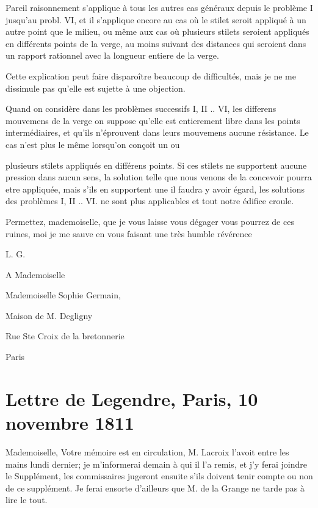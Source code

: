 \documentclass[11pt,a4paper]{article}
\begin{document}
Pareil raisonnement s'applique à tous les autres cas généraux depuis le
problème I jusqu'au probl. VI, et il s'applique encore au cas où le stilet
seroit appliqué à un autre point que le milieu, ou même aux cas où plusieurs
stilets seroient appliqués en différents points de la verge, au moins
suivant des distances qui seroient dans un rapport rationnel avec la
longueur entiere de la verge.

Cette explication peut faire disparoître beaucoup de difficultés, mais je ne
me dissimule pas qu'elle est sujette à une objection.

Quand on considère dans les problèmes successifs I, II .. VI, les differens
mouvemens de la verge on suppose qu'elle est entierement libre dans les
points intermédiaires, et qu'ils n'éprouvent dans leurs mouvemens aucune
résistance. Le cas n'est plus \struck{\ill{}} le même lorsqu'on conçoit un ou


plusieurs stilets appliqués en différens points. Si ces stilets ne
supportent aucune pression dans aucun sens, la solution telle que nous
venons de la concevoir pourra etre appliquée, mais s'ils en supportent une
il faudra y avoir égard, les solutions des problèmes I, II .. VI. ne sont
plus applicables et tout notre édifice croule.

Permettez, mademoiselle, que je vous laisse vous dégager  vous
pourrez de ces ruines, moi je me sauve en vous faisant une très humble
révérence

L. G.

A Mademoiselle

Mademoiselle Sophie Germain,

Maison de M. Degligny

Rue Ste Croix de la bretonnerie

Paris


\section{Lettre de Legendre, Paris, 10 novembre 1811}

Mademoiselle, Votre mémoire est en circulation, M. Lacroix l'avoit entre les
mains lundi dernier; je m'informerai demain à qui il l'a remis, et j'y ferai
joindre le Supplément, les commissaires jugeront ensuite s'ils doivent tenir
compte ou non de ce supplément. Je ferai ensorte d'ailleurs que M. de la
Grange ne tarde pas à lire le tout.
\end{document}
